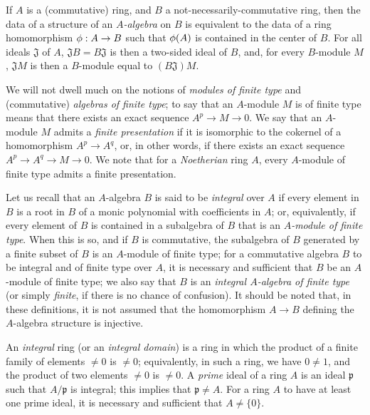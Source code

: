 \begin{env}[1.0.4]
\label{0.1.0.4}
If $A$ is a (commutative) ring, and $B$ a not-necessarily-commutative ring, then the data of a structure of an \emph{$A$-algebra} on $B$ is equivalent to the data of a ring homomorphism $\vphi:A\to B$ such that $\phi(A)$ is contained in the center of $B$.
For all ideals $\mathfrak{J}$ of $A$, $\mathfrak{J}B=B\mathfrak{J}$ is then a two-sided ideal of $B$, and, for every $B$-module $M$, $\mathfrak{J}M$ is then a $B$-module equal to $(B\mathfrak{J})M$.
\end{env}

\begin{env}[1.0.5]
\label{0.1.0.5}
We will not dwell much on the notions of \emph{modules of finite type} and
(commutative) \emph{algebras of finite type};
to say that an $A$-module $M$ is of finite type means that there exists
an exact sequence $A^p\to M\to 0$.
We say that an $A$-module $M$ admits a \emph{finite presentation} if it is isomorphic to the cokernel of a homomorphism $A^p\to A^q$, or, in other words, if there exists an exact sequence $A^p\to A^q\to M\to 0$.
We note that for a \emph{Noetherian} ring $A$, every $A$-module of finite type admits a finite presentation.

Let us recall that an $A$-algebra $B$ is said to be \emph{integral} over $A$ if every element in $B$ is a root in $B$ of a monic polynomial with coefficients in $A$;
or, equivalently, if every element of $B$ is contained in a subalgebra of $B$ that is an \emph{$A$-module of finite type}.
When this is so, and if $B$ is commutative, the subalgebra of $B$ generated by a finite subset of $B$ is an $A$-module of finite type;
for a commutative algebra $B$ to be integral and of finite type over $A$, it is necessary and sufficient that $B$ be an $A$-module of finite type;
we also say that $B$ is an \emph{integral $A$-algebra of finite type} (or simply \emph{finite}, if there is no chance of confusion).
It should be noted that, in these definitions, it is not assumed that the homomorphism $A\to B$ defining the $A$-algebra structure is injective.
\end{env}

\begin{env}[1.0.6]
\label{0.1.0.6}
An \emph{integral} ring (or an \emph{integral domain}) is a ring in which the product of a finite family of elements $\neq 0$ is $\neq 0$;
equivalently, in such a ring, we have $0\neq 1$, and the product of two elements $\neq 0$ is $\neq0$.
A \emph{prime} ideal of a ring $A$ is an ideal $\mathfrak{p}$ such that $A/\mathfrak{p}$ is integral;
this implies that $\mathfrak{p}\neq A$.
For a ring $A$ to have at least one prime ideal, it is necessary and sufficient that $A\neq\{0\}$.
\end{env}

